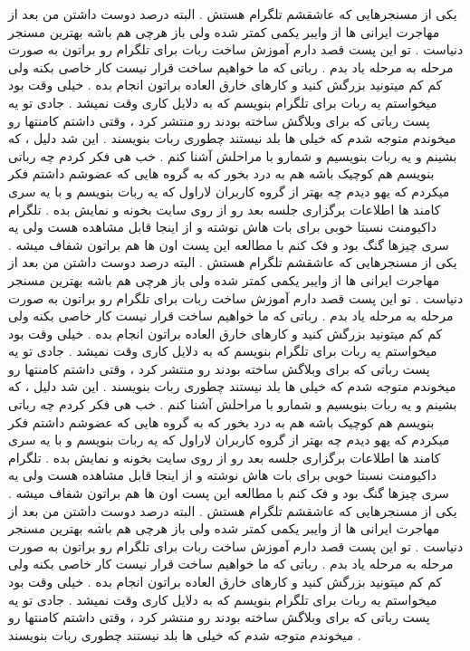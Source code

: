 \newpage
یکی از مسنجرهایی که عاشقشم تلگرام هستش . البته درصد دوست داشتن من بعد از مهاجرت ایرانی ها از وایبر یکمی کمتر شده ولی باز هرچی هم باشه بهترین مسنجر دنیاست .
تو این پست قصد دارم آموزش ساخت ربات برای تلگرام رو براتون به صورت مرحله به مرحله یاد بدم .
رباتی که ما خواهیم ساخت قرار نیست کار خاصی بکنه ولی کم کم میتونید بزرگش کنید و کارهای خارق العاده براتون انجام بده .
خیلی وقت بود میخواستم یه ربات برای تلگرام بنویسم که به دلایل کاری وقت نمیشد . جادی تو یه پست رباتی که برای وبلاگش ساخته بودند رو منتشر کرد ، وقتی داشتم کامنتها رو میخوندم متوجه شدم که خیلی ها بلد نیستند چطوری ربات بنویسند .
این شد دلیل ، که بشینم و یه ربات بنویسیم و شمارو با مراحلش آشنا کنم .
خب هی فکر کردم چه رباتی بنویسم هم کوچیک باشه هم به درد بخور که به گروه هایی که عضوشم داشتم فکر میکردم که یهو دیدم چه بهتر از گروه کاربران لاراول که یه ربات بنویسم و با یه سری کامند ها اطلاعات برگزاری جلسه بعد رو از روی سایت بخونه و نمایش بده .
تلگرام داکیومنت نسبتا خوبی برای بات هاش نوشته و از اینجا قابل مشاهده هست ولی یه سری چیزها گنگ بود و فک کنم با مطالعه این پست اون ها هم براتون شفاف میشه .
یکی از مسنجرهایی که عاشقشم تلگرام هستش . البته درصد دوست داشتن من بعد از مهاجرت ایرانی ها از وایبر یکمی کمتر شده ولی باز هرچی هم باشه بهترین مسنجر دنیاست .
تو این پست قصد دارم آموزش ساخت ربات برای تلگرام رو براتون به صورت مرحله به مرحله یاد بدم .
رباتی که ما خواهیم ساخت قرار نیست کار خاصی بکنه ولی کم کم میتونید بزرگش کنید و کارهای خارق العاده براتون انجام بده .
خیلی وقت بود میخواستم یه ربات برای تلگرام بنویسم که به دلایل کاری وقت نمیشد . جادی تو یه پست رباتی که برای وبلاگش ساخته بودند رو منتشر کرد ، وقتی داشتم کامنتها رو میخوندم متوجه شدم که خیلی ها بلد نیستند چطوری ربات بنویسند .
این شد دلیل ، که بشینم و یه ربات بنویسیم و شمارو با مراحلش آشنا کنم .
خب هی فکر کردم چه رباتی بنویسم هم کوچیک باشه هم به درد بخور که به گروه هایی که عضوشم داشتم فکر میکردم که یهو دیدم چه بهتر از گروه کاربران لاراول که یه ربات بنویسم و با یه سری کامند ها اطلاعات برگزاری جلسه بعد رو از روی سایت بخونه و نمایش بده .
تلگرام داکیومنت نسبتا خوبی برای بات هاش نوشته و از اینجا قابل مشاهده هست ولی یه سری چیزها گنگ بود و فک کنم با مطالعه این پست اون ها هم براتون شفاف میشه .
یکی از مسنجرهایی که عاشقشم تلگرام هستش . البته درصد دوست داشتن من بعد از مهاجرت ایرانی ها از وایبر یکمی کمتر شده ولی باز هرچی هم باشه بهترین مسنجر دنیاست .
تو این پست قصد دارم آموزش ساخت ربات برای تلگرام رو براتون به صورت مرحله به مرحله یاد بدم .
رباتی که ما خواهیم ساخت قرار نیست کار خاصی بکنه ولی کم کم میتونید بزرگش کنید و کارهای خارق العاده براتون انجام بده .
خیلی وقت بود میخواستم یه ربات برای تلگرام بنویسم که به دلایل کاری وقت نمیشد . جادی تو یه پست رباتی که برای وبلاگش ساخته بودند رو منتشر کرد ، وقتی داشتم کامنتها رو میخوندم متوجه شدم که خیلی ها بلد نیستند چطوری ربات بنویسند .
